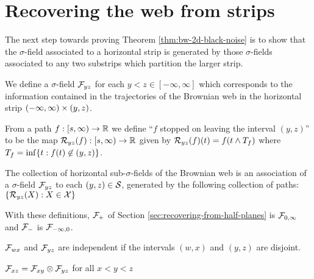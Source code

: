 {
\section{Recovering the web from strips}
\label{sec:recovering-from-strips}

The next step towards proving Theorem \ref{thm:bw-2d-black-noise} is
to show that the $\sigma$-field associated to a horizontal strip is
generated by those $\sigma$-fields associated to any two substrips
which partition the larger strip.

We define a $\sigma$-field $\mathcal{F}_{y z}$ for each $y < z \in
[-\infty, \infty]$ which corresponds to the information contained in
the trajectories of the Brownian web in the horizontal strip
$(-\infty, \infty) \times (y,z)$.

\newcommand{\brownianwebnoise}{collection of horizontal
  sub-$\sigma$-fields of the Brownian web}

\begin{definition}
  \newcommand{\T}{\stripleavetime{f}}
  \label{def:restrict}
  From a path $f : [s, \infty) \to \mathbb{R}$ we define ``$f$ stopped on
    leaving the interval $(y,z)$'' to be the map $\mathcal{R}_{{y}{z}}(f) : [s,
      \infty) \to \mathbb{R}$ given by $\restrict{y}{z}{f}(t) = f(t \minsym \T)$
      where $\T = \inf\{ t : f(t) \not\in (y,z) \}$.

  \label{def:horizontal-factorization}
  The \brownianwebnoise{} is an
  association of a $\sigma$-field $\mathcal{F}_{y z}$ to each $(y, z)
  \in \mathcal{S}$, generated by the following collection of paths:
  $\{ \mathcal{R}_{{y}{z}}(X) : X \in \mathcal{X} \}$
\end{definition}


With these definitions, $\mathcal{F}_{+}$ of Section \ref{sec:recovering-from-half-planes} is
$\mathcal{F}_{0,\infty}$ and $\mathcal{F}_{-}$ is
$\mathcal{F}_{-\infty,0}$.

\begin{observation}
  $\mathcal{F}_{w x}$ and $\mathcal{F}_{y z}$ are independent if the
  intervals $(w,x)$ and $(y,z)$ are disjoint.
\end{observation}

\renewcommand{\top}{b}
\newcommand{\bottom}{a}

\begin{theorem}\label{thm:recoveringfromstrips}
  $\mathcal{F}_{x z} = \mathcal{F}_{x y} \otimes \mathcal{F}_{y z}$ for all $x < y < z$
\end{theorem}

}
